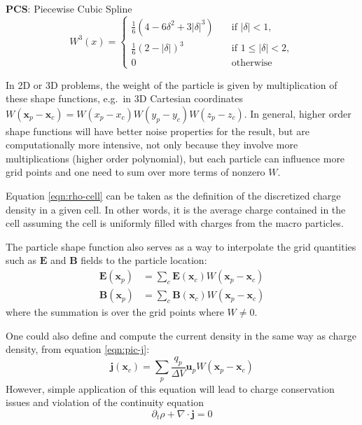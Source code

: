 \textbf{PCS}: Piecewise Cubic Spline
\begin{equation}
    W^3(x) =
    \begin{cases}
        \frac{1}{6} \left( 4 - 6\delta^2 + 3|\delta|^3 \right) & \quad \text{if } |\delta| < 1, \\
        \frac{1}{6} \left( 2 - |\delta| \right)^3 & \quad \text{if } 1 \leq |\delta| < 2, \\
        0                      & \quad \text{otherwise}
    \end{cases}
\end{equation}

In 2D or 3D problems, the weight of the particle is given by multiplication of
these shape functions, e.g.\ in 3D Cartesian coordinates $W(\mathbf{x}_{p} -
\mathbf{x}_{c}) = W(x_{p} - x_{c})W(y_{p} - y_{c})W(z_{p} - z_{c})$. In general,
higher order shape functions will have better noise properties for the result,
but are computationally more intensive, not only because they involve more
multiplications (higher order polynomial), but each particle can influence more
grid points and one need to sum over more terms of nonzero $W$.

Equation \eqref{eqn:rho-cell} can be taken as the definition of the discretized
charge density in a given cell. In other words, it is the average charge
contained in the cell assuming the cell is uniformly filled with charges from
the macro particles.

The particle shape function also serves as a way to interpolate the grid
quantities such as $\mathbf{E}$ and $\mathbf{B}$ fields to the particle
location:
\begin{align}
    \label{eqn:interpolate}
    \mathbf{E}(\mathbf{x}_p) &= \sum_c \mathbf{E}(\mathbf{x}_c) W(\mathbf{x}_p - \mathbf{x}_c) \\
    \mathbf{B}(\mathbf{x}_p) &= \sum_c \mathbf{B}(\mathbf{x}_c) W(\mathbf{x}_p - \mathbf{x}_c)
\end{align}
where the summation is over the grid points where $W \neq 0$.

One could also define and compute the current density in the same way as charge density,
from equation \eqref{eqn:pic-j}:
\begin{equation}
  \label{eq:naive-j}
  \mathbf{j} ( \mathbf{x}_{c} ) = \sum_{p} \frac{q_{p}}{\Delta V}\mathbf{u}_p W (
  \mathbf{x}_{p} -\mathbf{x}_{c} )
\end{equation}
However, simple application of this equation will lead to charge
conservation issues and violation of the continuity equation
\begin{equation}
    \label{eq:continuity}
    \partial_t\rho + \nabla\cdot \mathbf{j} = 0
\end{equation}

